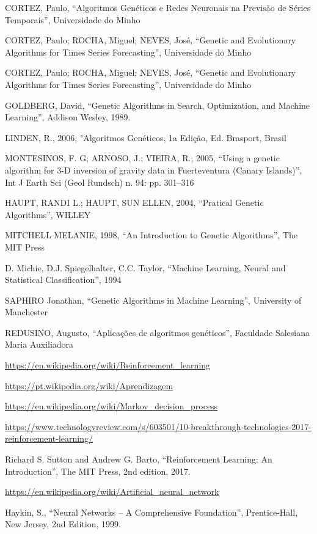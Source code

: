 
\begin{thebibliography}{1}

CORTEZ, Paulo, “Algoritmos Genéticos e Redes Neuronais na Previsão de Séries Temporais”, Universidade do Minho


CORTEZ, Paulo; ROCHA, Miguel; NEVES, José, “Genetic and Evolutionary Algorithms for Times Series Forecasting”, Universidade do Minho


CORTEZ, Paulo; ROCHA, Miguel; NEVES, José, “Genetic and Evolutionary Algorithms for Times Series Forecasting”, Universidade do Minho

GOLDBERG, David, “Genetic Algorithms in Search, Optimization, and Machine Learning”, Addison Wesley, 1989. 

LINDEN, R., 2006, "Algoritmos Genéticos, 1a Edição, Ed. Brasport, Brasil

MONTESINOS, F. G; ARNOSO, J.; VIEIRA, R., 2005, “Using a genetic algorithm for 3-D inversion of gravity data in Fuerteventura (Canary Islands)”, Int J Earth Sci (Geol Rundsch) n. 94: pp. 301–316 

HAUPT, RANDI L.; HAUPT, SUN ELLEN, 2004, “Pratical Genetic Algorithms”, WILLEY

MITCHELL MELANIE, 1998, “An Introduction to Genetic Algorithms”, The MIT Press

D. Michie, D.J. Spiegelhalter, C.C. Taylor, “Machine Learning, Neural and Statistical Classification”, 1994

SAPHIRO Jonathan, “Genetic Algorithms in Machine Learning”, University of Manchester

REDUSINO, Augusto, “Aplicações de algoritmos genéticos”, Faculdade Salesiana Maria Auxiliadora 

\url{https://en.wikipedia.org/wiki/Reinforcement_learning}

\url{https://pt.wikipedia.org/wiki/Aprendizagem}

\url{https://en.wikipedia.org/wiki/Markov_decision_process}

\url{https://www.technologyreview.com/s/603501/10-breakthrough-technologies-2017-reinforcement-learning/}

Richard S. Sutton and Andrew G. Barto, “Reinforcement Learning: An Introduction”, The MIT Press, 2nd edition, 2017.

\url{https://en.wikipedia.org/wiki/Artificial_neural_network}

Haykin, S., “Neural Networks – A Comprehensive Foundation”, Prentice-Hall, New Jersey,
2nd Edition, 1999.


\end{thebibliography}
